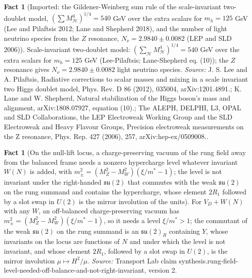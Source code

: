 \documentclass[11pt]{article}
\theoremstyle{definition}
\newtheorem{fact}[theorem]{Fact}
\theoremstyle{plain}
\providecommand{\su}{}\renewcommand{\su}{\mathfrak{su}}
\begin{document}
\begin{fact}[Imported: the Gildener-Weinberg sum rule of the scale-invariant two-doublet model, $(\sum M_{\mathcal H}^{4})^{1/4} = 540$ GeV over the extra scalars for $m_{h} = 125$ GeV (Lee and Pilaftsis 2012; Lane and Shepherd 2018), and the number of light neutrino species from the $Z$ resonance, $N_{\nu} = 2.9840 \pm 0.0082$ (LEP and SLD 2006)]\label{c:synthesis.imported-two-doublet-scalon-sum-rule-and-lep-neutrino-count}
Scale-invariant two-doublet model: $(\sum_{\mathcal H}M_{\mathcal H}^{4})^{1/4} = 540$ GeV over the extra scalars for $m_{h} = 125$ GeV (Lee-Pilaftsis; Lane-Shepherd eq. (10)); the $Z$ resonance gives $N_{\nu} = 2.9840 \pm 0.0082$ light neutrino species.
\emph{Source:} J. S. Lee and A. Pilaftsis, Radiative corrections to scalar masses and mixing in a scale invariant two Higgs doublet model, Phys. Rev. D 86 (2012), 035004, arXiv:1201.4891.; K. Lane and W. Shepherd, Natural stabilization of the Higgs boson's mass and alignment, arXiv:1808.07927, equation (10).; The ALEPH, DELPHI, L3, OPAL and SLD Collaborations, the LEP Electroweak Working Group and the SLD Electroweak and Heavy Flavour Groups, Precision electroweak measurements on the Z resonance, Phys. Rep. 427 (2006), 257, arXiv:hep-ex/0509008..
\end{fact}

\begin{fact}[On the null-lift locus, a charge-preserving vacuum of the rung field away from the balanced frame needs a nonzero hypercharge level whatever invariant $W(N)$ is added, with $m_{\pm}^{2} = (M_{Z}^{2} - M_{W}^{2})(\xi/m^{*} - 1)$; the level is not invariant under the right-handed $\su(2)$ that commutes with the weak $\su(2)$ on the rung summand and contains the hypercharge, whose element $2R_{1}$ followed by a slot swap in $U(2)$ is the mirror involution of the units]\label{c:synthesis.rung-field-level-needed-off-balance-and-not-right-invariant}
For $V_{D} + W(N)$ with any $W$, an off-balanced charge-preserving vacuum has $m_{\pm}^{2} = (M_{Z}^{2} - M_{W}^{2})(\xi/m^{*} - 1)$, so it needs a level $\xi/m^{*} > 1$; the commutant of the weak $\su(2)$ on the rung summand is an $\su(2)_{R}$ containing $Y$, whose invariants on the locus are functions of $N$ and under which the level is not invariant, and whose element $2R_{1}$, followed by a slot swap in $U(2)$, is the mirror involution $\mu \mapsto H^{2}/\mu$.
\emph{Source:} Transport Lab claim synthesis.rung-field-level-needed-off-balance-and-not-right-invariant, version 2.
\end{fact}
\end{document}
